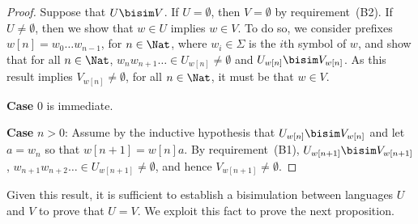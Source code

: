 \begin{proof}
  Suppose
  that $U \bisim V$. If $U=\emptyset$, then $V=\emptyset$ by requirement~(B2). If $U\ne\emptyset$,
  then we show that $w \in U$ implies $w\in V$. To do so, we consider prefixes $w[n] = w_0\dots
  w_{n-1}$, for $n\in\Nat$, where $w_i \in\Sigma$ is the $i$th symbol of $w$, and show that for all $n\in\Nat$,
  $w_nw_{n+1}\ldots \in U_{w[n]} \ne \emptyset$ and $U_{w[n]} \bisim V_{w[n]}$. As this result implies $V_{w[n]}
  \ne\emptyset$, for all $n\in\Nat$, it must be that $w \in V$.

  \textbf{Case }$0$ is immediate.

  \textbf{Case }$n>0$: Assume by the inductive hypothesis that $U_{w[n]} \bisim V_{w[n]}$ and let
  $a=w_n$ so that $w[n+1] = w[n]a$. By requirement~(B1), $U_{w[n+1]} \bisim V_{w[n+1]}$,
  $w_{n+1}w_{n+2}\ldots \in U_{w[n+1]} \ne \emptyset$, and hence $V_{w[n+1]} \ne \emptyset$.
\end{proof}

Given this result, it is sufficient to establish a bisimulation between languages $U$ and $V$ to
prove that $U=V$. We exploit this fact to prove the next proposition.

